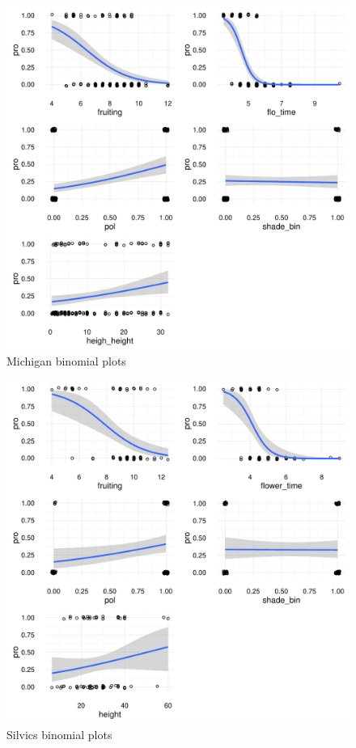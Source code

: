 \documentclass{article}\usepackage[]{graphicx}\usepackage[]{color}
\makeatletter
\def\maxwidth{ %
  \ifdim\Gin@nat@width>\linewidth
    \linewidth
  \else
    \Gin@nat@width
  \fi
}
\newenvironment{knitrout}{}{} %
\makeatother
\begin{document}
\begin{figure}[h!]
\begin{knitrout}
\color{fgcolor}
\includegraphics[width=\maxwidth]{figure/unnamed-chunk-6-1} 

\end{knitrout}
\caption{Michigan binomial plots}
\end{figure}

\begin{figure}[h!]
\begin{knitrout}
\color{fgcolor}
\includegraphics[width=\maxwidth]{figure/unnamed-chunk-7-1} 

\end{knitrout}
\caption{Silvics binomial plots}
\end{figure}
\end{document}
